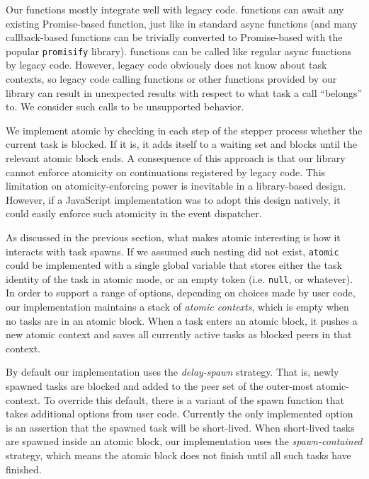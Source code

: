 \documentclass[acmsmall,anonymous,review]{acmart}\settopmatter{printfolios=true,printccs=false,printacmref=false}
\begin{document}
Our \asyncs{} functions mostly integrate well with legacy code.
\asyncs{} functions can await any existing Promise-based function, just like in standard async functions (and many callback-based functions can be trivially converted to Promise-based with the popular \texttt{promisify} library).
\asyncs{} functions can be called like regular async functions by legacy code.
However, legacy code obviously does not know about task contexts, so legacy code calling \asyncs{} functions or other functions provided by our library can result in unexpected results with respect to what task a call ``belongs'' to.
We consider such calls to be unsupported behavior.

We implement atomic by checking in each step of the stepper process whether the current task is blocked.
If it is, it adds itself to a waiting set and blocks until the relevant atomic block ends.
A consequence of this approach is that our library cannot enforce atomicity on continuations registered by legacy code.
This limitation on atomicity-enforcing power is inevitable in a library-based design.
However, if a JavaScript implementation was to adopt this design natively, it could easily enforce such atomicity in the event dispatcher.

As discussed in the previous section, what makes atomic interesting is how it interacts with task spawns.
If we assumed such nesting did not exist, \texttt{atomic} could be implemented with a single global variable that stores either the task identity of the task in atomic mode, or an empty token (i.e. \texttt{null}, or whatever).
In order to support a range of options, depending on choices made by user code, our implementation maintains a stack of \emph{atomic contexts}, which is empty when no tasks are in an atomic block.
When a task enters an atomic block, it pushes a new atomic context and saves all currently active tasks as blocked peers in that context.

By default our implementation uses the \emph{delay-spawn} strategy.
That is, newly spawned tasks are blocked and added to the peer set of the outer-most atomic-context.
To override this default, there is a variant of the spawn function that takes additional options from user code.
Currently the only implemented option is an assertion that the spawned task will be short-lived.
When short-lived tasks are spawned inside an atomic block, our implementation uses the \emph{spawn-contained} strategy, which means the atomic block does not finish until all such tasks have finished.
\end{document}
